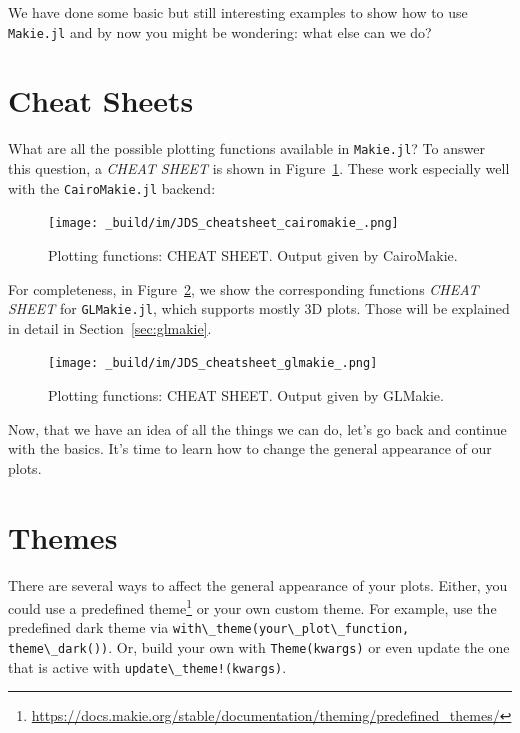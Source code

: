 \documentclass[
  notoc %
]{tufte-book}
\DeclareRobustCommand{\href}[2]{#2\footnote{\url{#1}}}
\newcommand{\passthrough}[1]{#1}
\begin{document}
We have done some basic but still interesting examples to show how to
use \passthrough{\lstinline!Makie.jl!} and by now you might be
wondering: what else can we do?

\hypertarget{sec:makie_cheat_sheets}{%
\section{Cheat Sheets}\label{sec:makie_cheat_sheets}}

What are all the possible plotting functions available in
\passthrough{\lstinline!Makie.jl!}? To answer this question, a
\emph{CHEAT SHEET} is shown in Figure~\ref{fig:cheat_sheet_cairo}. These
work especially well with the \passthrough{\lstinline!CairoMakie.jl!}
backend:

\begin{figure}
\hypertarget{fig:cheat_sheet_cairo}{%
\centering
\texttt{[image: \_build/im/JDS\_cheatsheet\_cairomakie\_.png]}
\caption{Plotting functions: CHEAT SHEET. Output given by
CairoMakie.}\label{fig:cheat_sheet_cairo}
}
\end{figure}

For completeness, in Figure~\ref{fig:cheat_sheet_glmakie}, we show the
corresponding functions \emph{CHEAT SHEET} for
\passthrough{\lstinline!GLMakie.jl!}, which supports mostly 3D plots.
Those will be explained in detail in Section~\ref{sec:glmakie}.

\begin{figure}
\hypertarget{fig:cheat_sheet_glmakie}{%
\centering
\texttt{[image: \_build/im/JDS\_cheatsheet\_glmakie\_.png]}
\caption{Plotting functions: CHEAT SHEET. Output given by
GLMakie.}\label{fig:cheat_sheet_glmakie}
}
\end{figure}

Now, that we have an idea of all the things we can do, let's go back and
continue with the basics. It's time to learn how to change the general
appearance of our plots.

\hypertarget{sec:themes}{%
\section{Themes}\label{sec:themes}}

There are several ways to affect the general appearance of your plots.
Either, you could use a
\href{https://docs.makie.org/stable/documentation/theming/predefined_themes/}{predefined
theme} or your own custom theme. For example, use the predefined dark
theme via
\passthrough{\lstinline!with\_theme(your\_plot\_function, theme\_dark())!}.
Or, build your own with \passthrough{\lstinline!Theme(kwargs)!} or even
update the one that is active with
\passthrough{\lstinline"update\_theme!(kwargs)"}.
\end{document}
